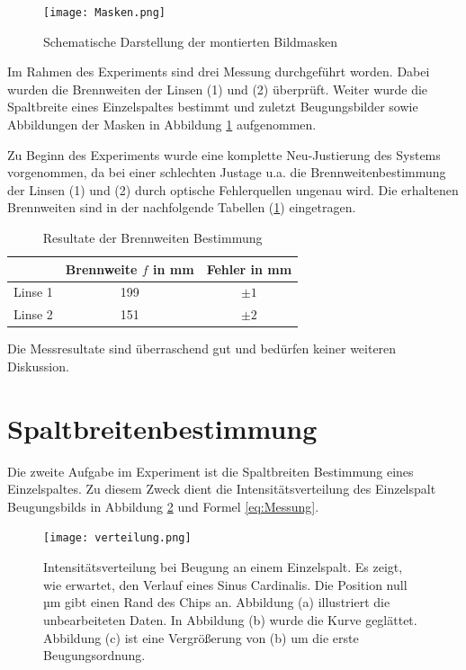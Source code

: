 \begin{figure}[h]
\centering
\texttt{[image: Masken.png]}
\caption[Maskenformen]{Schematische Darstellung der montierten Bildmasken}
\label{Masken}
\end{figure}

Im Rahmen des Experiments sind drei Messung durchgeführt worden. Dabei wurden die Brennweiten der Linsen (1) und (2) überprüft. Weiter wurde die Spaltbreite eines Einzelspaltes bestimmt und zuletzt Beugungsbilder sowie Abbildungen der Masken in Abbildung \ref{Masken} aufgenommen.

Zu Beginn des Experiments wurde eine komplette Neu-Justierung des Systems vorgenommen, da bei einer schlechten Justage u.a. die Brennweitenbestimmung der Linsen (1) und (2) durch optische Fehlerquellen ungenau wird. Die erhaltenen Brennweiten sind in der nachfolgende Tabellen (\ref{Brennweite}) eingetragen.

\begin{table}[hb]
	\centering
	\caption[]{Resultate der Brennweiten Bestimmung}
	\begin{tabular}{ccc}
		\toprule
				& Brennweite $f$ in mm 	& 	Fehler in mm	\\
		\midrule
		Linse 1	& 199				&	$\pm1$		\\
		Linse 2	& 151				&	$\pm2$		\\
		\bottomrule
	\end{tabular}
	\label{Brennweite}
\end{table}

Die Messresultate sind überraschend gut und bedürfen keiner weiteren Diskussion.

\section{Spaltbreitenbestimmung} \label{Spaltbreitenbestimmung}
Die zweite Aufgabe im Experiment ist die Spaltbreiten Bestimmung eines Einzelspaltes. Zu diesem Zweck dient die Intensitätsverteilung des Einzelspalt Beugungsbilds in Abbildung \ref{ESpaltBeugung} und Formel \eqref{eq:Messung}.
\begin{figure}[h]
\centering
\texttt{[image: verteilung.png]}
\caption[Intensitätsverteilung]{Intensitätsverteilung bei Beugung an einem Einzelspalt. Es zeigt, wie erwartet, den Verlauf eines Sinus Cardinalis. Die Position null µm gibt einen Rand des Chips an. Abbildung (a) illustriert die unbearbeiteten Daten. In Abbildung (b) wurde die Kurve geglättet. Abbildung (c) ist eine Vergrößerung von (b) um die erste Beugungsordnung.}
\label{ESpaltBeugung}
\end{figure}


